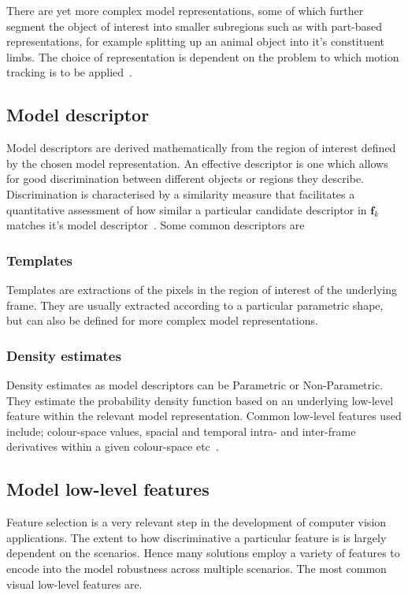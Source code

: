 There are yet more complex model representations, some of which further segment
the object of interest into smaller subregions such as with part-based
representations, for example splitting up an animal object into it's constituent
limbs. The choice of representation is dependent on the problem to which motion
tracking is to be applied~\cite{Porikli2012}.

\subsection{Model descriptor}\label{literature_review_descriptors}
Model descriptors are derived mathematically from the region of interest defined
by the chosen model representation. An effective descriptor is one which allows
for good discrimination between different objects or regions they
describe. Discrimination is characterised by a similarity measure that
facilitates a quantitative assessment of how similar a particular candidate
descriptor in $\mathbf{f}_{k}$ matches it's model descriptor~\cite{Shantaiya2013}.
Some common descriptors are

\subsubsection{Templates}\label{literature_review_template}
Templates are extractions of the pixels in the region of interest of the
underlying frame. They are usually extracted according to a particular
parametric shape, but can also be defined for more complex model representations.

\subsubsection{Density estimates}
Density estimates as model descriptors can be Parametric or Non-Parametric. They
estimate the probability density function based on an underlying low-level
feature within the relevant model representation.
Common low-level features used include; colour-space values, spacial and
temporal intra- and inter-frame derivatives within a given colour-space
etc~\cite{Shantaiya2013}.

\subsection{Model low-level features}
Feature selection is a very relevant step in the development of computer vision
applications. The extent to how discriminative a particular feature is is
largely dependent on the scenarios. Hence many solutions employ a
variety of features to encode into the model robustness across multiple
scenarios. The most common visual low-level features are.

